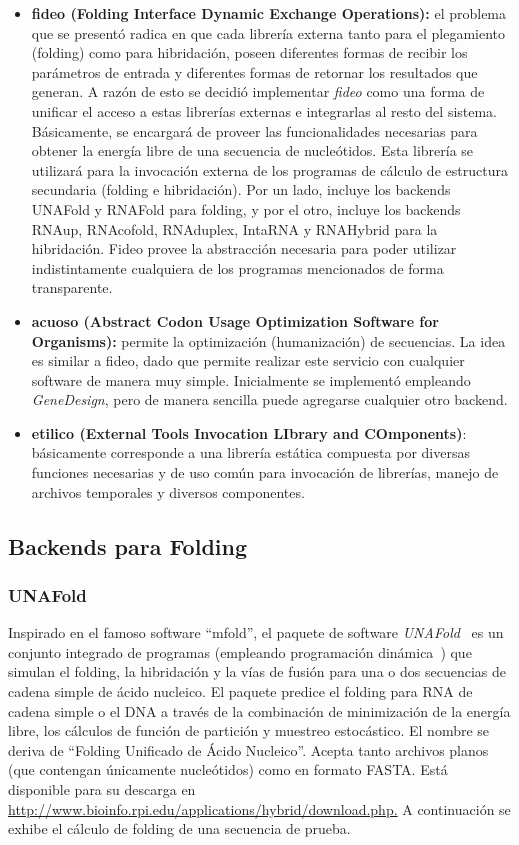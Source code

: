 \begin{itemize}
	\item \textbf{fideo (Folding Interface Dynamic Exchange Operations): } el problema que se presentó radica en que cada librería externa tanto para el plegamiento (folding) como para hibridación, poseen diferentes formas de recibir los parámetros de entrada y diferentes formas de retornar los resultados que generan. A razón de esto se decidió implementar \emph{fideo} como una forma de unificar el acceso a estas librerías externas e integrarlas al resto del sistema. Básicamente, se encargará de proveer las funcionalidades necesarias para obtener la energía libre de una secuencia de nucleótidos. Esta librería se utilizará para la invocación externa de los programas de cálculo de estructura secundaria (folding e hibridación). Por un lado, incluye los backends UNAFold y RNAFold para folding, y por el otro, incluye los backends RNAup, RNAcofold, RNAduplex, IntaRNA y RNAHybrid para la hibridación. Fideo provee la abstracción necesaria para poder utilizar indistintamente cualquiera de los programas mencionados de forma transparente.

	\item \textbf{acuoso (Abstract Codon Usage Optimization Software for Organisms): } permite la optimización (humanización) de secuencias. La idea es similar a fideo, dado que permite realizar este servicio con cualquier software de manera muy simple. Inicialmente se implementó empleando \emph{GeneDesign}, pero de manera sencilla puede agregarse cualquier otro backend.

	\item \textbf{etilico (External Tools Invocation LIbrary and COmponents)}: básicamente corresponde a una librería estática compuesta por diversas funciones necesarias y de uso común para invocación de librerías, manejo de archivos temporales y diversos componentes.
\end{itemize}

\subsection{Backends para Folding}

\subsubsection{UNAFold}
\label{unafold}
\par Inspirado en el famoso software ``mfold'', el paquete de software \emph{UNAFold}~\cite{unafold} es un conjunto integrado de programas (empleando programación dinámica~\cite{ProgDinaminca}) que simulan el folding, la hibridación y la vías de fusión para una o dos secuencias de cadena simple de ácido nucleico. El paquete predice el folding para RNA de cadena simple o el DNA a través de la combinación de minimización de la energía libre, los cálculos de función de partición y muestreo estocástico. El nombre se deriva de ``Folding Unificado de Ácido Nucleico''. Acepta tanto archivos planos (que contengan únicamente nucleótidos) como en formato FASTA. Está disponible para su descarga en \url{http://www.bioinfo.rpi.edu/applications/hybrid/download.php.}
A continuación se exhibe el cálculo de folding de una secuencia de prueba.

